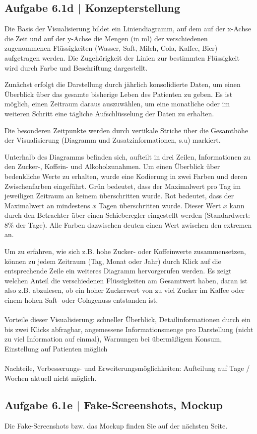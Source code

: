 \documentclass[a4paper,12pt,ngerman]{scrartcl}
\begin{document}
\subsection{Aufgabe 6.1d | Konzepterstellung}
Die Basis der Visualisierung bildet ein Liniendiagramm, auf dem auf der x-Achse die Zeit und auf der y-Achse die Mengen (in ml) der verschiedenen zugenommenen Flüssigkeiten (Wasser, Saft, Milch, Cola, Kaffee, Bier) aufgetragen werden. Die Zugehörigkeit der Linien zur bestimmten Flüssigkeit wird durch Farbe und Beschriftung dargestellt.

Zunächst erfolgt die Darstellung durch jährlich konsolidierte Daten, um einen Überblick über das gesamte bisherige Leben des Patienten zu geben. Es ist möglich, einen Zeitraum daraus auszuwählen, um eine monatliche oder im weiteren Schritt eine tägliche Aufschlüsselung der Daten zu erhalten.

Die besonderen Zeitpunkte werden durch vertikale Striche über die Gesamthöhe der Visualisierung (Diagramm und Zusatzinformationen, s.u) markiert.

Unterhalb des Diagramms befinden sich, aufteilt in drei Zeilen, Informationen zu den Zucker-, Koffein- und Alkoholzunahmen. Um einen Überblick über bedenkliche Werte zu erhalten, wurde eine Kodierung in zwei Farben und deren Zwischenfarben eingeführt. Grün bedeutet, dass der Maximalwert pro Tag im jeweiligen Zeitraum an keinem überschritten wurde. Rot bedeutet, dass der Maximalwert an mindestens $x$ Tagen überschritten wurde. Dieser Wert $x$ kann durch den Betrachter über einen Schieberegler eingestellt werden (Standardwert: 8\% der Tage). Alle Farben dazwischen deuten einen Wert zwischen den extremen an.

Um zu erfahren, wie sich z.B. hohe Zucker- oder Koffeinwerte zusammensetzen, können zu jedem Zeitraum (Tag, Monat oder Jahr) durch Klick auf die entsprechende Zeile ein weiteres Diagramm hervorgerufen werden. Es zeigt welchen Anteil die verschiedenen Flüssigkeiten am Gesamtwert haben, daran ist also z.B. abzulesen, ob ein hoher Zuckerwert von zu viel Zucker im Kaffee oder einem hohen Saft- oder Colagenuss entstanden ist.
\\\\
Vorteile dieser Visualisierung: schneller Überblick, Detailinformationen durch ein bis zwei Klicks abfragbar, angemessene Informationsmenge pro Darstellung (nicht zu viel Information auf einmal), Warnungen bei übermäßigem Konsum, Einstellung auf Patienten möglich
\\\\
Nachteile, Verbesserungs- und Erweiterungsmöglichkeiten: Aufteilung auf Tage / Wochen aktuell nicht möglich.

\subsection{Aufgabe 6.1e | Fake-Screenshots, Mockup}
Die Fake-Screenshots bzw. das Mockup finden Sie auf der nächsten Seite.


\end{document}
